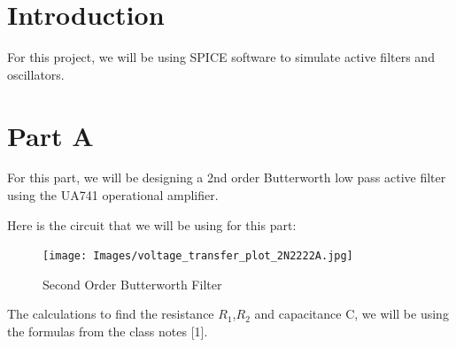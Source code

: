 \documentclass[12pt]{article}
\begin{document}
\pagebreak
{}
\tableofcontents
\pagebreak
\listoffigures
\listoftables
\pagebreak
{}


\section{Introduction}
For this project, we will be using SPICE software to simulate active filters and oscillators.
\section{Part A}
For this part, we will be designing a 2nd order Butterworth low pass active filter using the UA741 operational amplifier. 

Here is the circuit that we will be using for this part:

\begin{figure}[H]
    \centering
    \texttt{[image: Images/voltage\_transfer\_plot\_2N2222A.jpg]}\\
    \caption{Second Order Butterworth Filter}
    \label{fig:transfer_plot_2N2222A}
\end{figure}
The calculations to find the resistance $R_1$,$R_2$ and capacitance C, we will be using the formulas from the class notes [1].  
\end{document}
